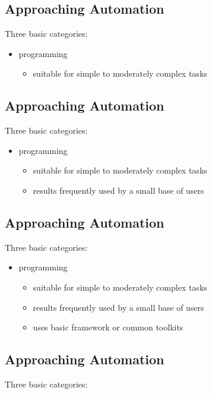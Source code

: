 \documentclass[xga]{xdvislides}
\begin{document}
\subsection{Approaching Automation}
Three basic categories:
\\

\begin{itemize}
	\item programming
		\begin{itemize}
			\item suitable for simple to moderately complex tasks
		\end{itemize}
\end{itemize}

\subsection{Approaching Automation}
Three basic categories:
\\

\begin{itemize}
	\item programming
		\begin{itemize}
			\item suitable for simple to moderately complex tasks
			\item results frequently used by a small base of users
		\end{itemize}
\end{itemize}

\subsection{Approaching Automation}
Three basic categories:
\\

\begin{itemize}
	\item programming
		\begin{itemize}
			\item suitable for simple to moderately complex tasks
			\item results frequently used by a small base of users
			\item uses basic framework or common toolkits
		\end{itemize}
\end{itemize}

\subsection{Approaching Automation}
Three basic categories:
\\
\end{document}
